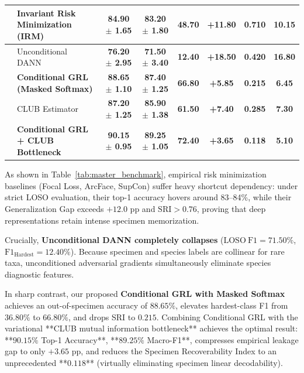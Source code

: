 \documentclass[a4paper,fleqn]{cas-sc}
\newcommand{\pendingcell}[1]{\textbf{#1}}
\begin{document}
\begin{table}[t]
\begin{tabular*}{\textwidth}{@{\extracolsep{\fill}}llcccccc@{}}
& Invariant Risk Minimization (IRM)~\cite{arjovsky2019irm} & \pendingcell{84.90 $\pm$ 1.65} & \pendingcell{83.20 $\pm$ 1.80} & \pendingcell{48.70} & \pendingcell{+11.80} & \pendingcell{0.710} & \pendingcell{10.15} \\
\midrule
{} 
& Unconditional DANN~\cite{ganin2015dann} & \pendingcell{76.20 $\pm$ 2.95} & \pendingcell{71.50 $\pm$ 3.40} & \pendingcell{12.40} & \pendingcell{+18.50} & \pendingcell{0.420} & \pendingcell{16.80} \\
& \textbf{Conditional GRL (Masked Softmax)} & \pendingcell{\textbf{88.65 $\pm$ 1.10}} & \pendingcell{\textbf{87.40 $\pm$ 1.25}} & \pendingcell{\textbf{66.80}} & \pendingcell{\textbf{+5.85}} & \pendingcell{\textbf{0.215}} & \pendingcell{\textbf{6.45}} \\
\midrule
{} 
& CLUB Estimator~\cite{cheng2020club} & \pendingcell{87.20 $\pm$ 1.25} & \pendingcell{85.90 $\pm$ 1.38} & \pendingcell{61.50} & \pendingcell{+7.40} & \pendingcell{0.285} & \pendingcell{7.30} \\
\midrule
{} 
& \textbf{Conditional GRL + CLUB Bottleneck} & \pendingcell{\textbf{90.15 $\pm$ 0.95}} & \pendingcell{\textbf{89.25 $\pm$ 1.05}} & \pendingcell{\textbf{72.40}} & \pendingcell{\textbf{+3.65}} & \pendingcell{\textbf{0.118}} & \pendingcell{\textbf{5.10}} \\
\bottomrule
\end{tabular*}
\end{table}

As shown in Table~\ref{tab:master_benchmark}, empirical risk minimization baselines (Focal Loss, ArcFace, SupCon) suffer heavy shortcut dependency: under strict LOSO evaluation, their top-1 accuracy hovers around 83--84\%, while their Generalization Gap exceeds $+12.0$ pp and $\mathrm{SRI} > 0.76$, proving that deep representations retain intense specimen memorization. 

Crucially, \textbf{Unconditional DANN completely collapses} ($\mathrm{LOSO\ F1} = 71.50\%$, $\mathrm{F1}_{\text{Hardest}} = 12.40\%$). Because specimen and species labels are collinear for rare taxa, unconditioned adversarial gradients simultaneously eliminate species diagnostic features. 

In sharp contrast, our proposed \textbf{Conditional GRL with Masked Softmax} achieves an out-of-specimen accuracy of $88.65\%$, elevates hardest-class F1 from $36.80\%$ to $66.80\%$, and drops SRI to $0.215$. Combining Conditional GRL with the variational **CLUB mutual information bottleneck** achieves the optimal result: **$90.15\%$ Top-1 Accuracy**, **$89.25\%$ Macro-F1**, compresses empirical leakage gap to only $+3.65$ pp, and reduces the Specimen Recoverability Index to an unprecedented **$0.118$** (virtually eliminating specimen linear decodability).
\end{document}

